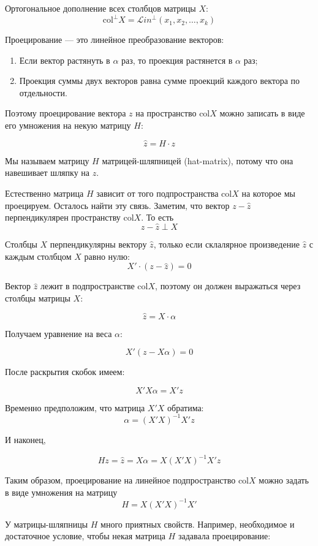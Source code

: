 \documentclass[11pt,russian,]{article}
\newcommand{\1}{\mathbbm{1}}
\newcommand{\Lin}{\mathcal{L}in}
\newcommand{\Linp}{\Lin^{\perp}}
\newcommand{\col}{\mathcal{col}}
\newcommand{\colp}{\col^{\perp}}
\renewcommand{\col}{\mathrm{col}}
\begin{document}
Ортогональное дополнение всех столбцов матрицы \(X\): \[
\colp X = \Linp(x_1, x_2, \ldots, x_k)
\]

Проецирование --- это линейное преобразование векторов:

\begin{enumerate}
\def\labelenumi{\arabic{enumi}.}
\item
  Если вектор растянуть в \(\alpha\) раз, то проекция растянется в
  \(\alpha\) раз;
\item
  Проекция суммы двух векторов равна сумме проекций каждого вектора по
  отдельности.
\end{enumerate}

Поэтому проецирование вектора \(z\) на пространство \(\col X\) можно
записать в виде его умножения на некую матрицу \(H\):

\[
\hat z = H \cdot z
\]

Мы называем матрицу \(H\) матрицей-шляпницей (hat-matrix), потому что
она навешивает шляпку на \(z\).

Естественно матрица \(H\) зависит от того подпространства \(\col X\) на
которое мы проецируем. Осталось найти эту связь. Заметим, что вектор
\(z - \hat z\) перпендикулярен пространству \(\col X\). То есть \[
z - \hat z \perp X
\]

Столбцы \(X\) перпендикулярны вектору \(\hat z\), только если склалярное
произведение \(\hat z\) с каждым столбцом \(X\) равно нулю: \[
X' \cdot (z - \hat z) = 0
\]

Вектор \(\hat z\) лежит в подпространстве \(\col X\), поэтому он должен
выражаться через столбцы матрицы \(X\):

\[
\hat z = X\cdot \alpha
\]

Получаем уравнение на веса \(\alpha\):

\[
X' (z - X\alpha)=0
\]

После раскрытия скобок имеем:

\[
X'X\alpha = X'z
\]

Временно предположим, что матрица \(X'X\) обратима: \[
\alpha = (X'X)^{-1}X'z
\]

И наконец,

\[
Hz = \hat z = X\alpha = X(X'X)^{-1}X'z
\]

Таким образом, проецирование на линейное подпространство \(\col X\)
можно задать в виде умножения на матрицу \[
H=X(X'X)^{-1}X'
\]

У матрицы-шляпницы \(H\) много приятных свойств. Например, необходимое и
достаточное условие, чтобы некая матрица \(H\) задавала проецирование:
\end{document}
